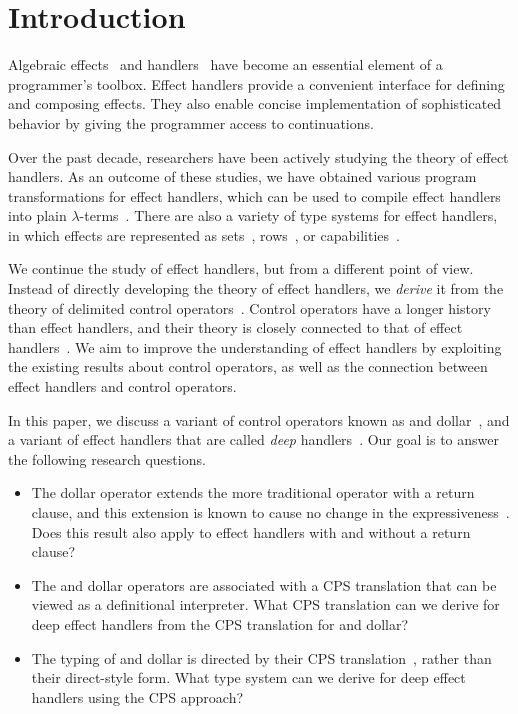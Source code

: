 \section{Introduction}
\label{sec:intro}

Algebraic effects~\cite{plotkin-effect} and handlers~\cite{plotkin-handler}
have become an essential element of a programmer's toolbox.
Effect handlers provide a convenient interface for defining and composing
effects.
They also enable concise implementation of sophisticated behavior by giving
the programmer access to continuations.

Over the past decade, researchers have been actively studying the theory
of effect handlers.
As an outcome of these studies, we have obtained various program
transformations for effect handlers, which can be used to compile effect
handlers into plain
$\lambda$-terms~\cite{hillerstrom-cps,schuster-capability,xie-evidently}.
There are also a variety of type systems for effect handlers, in which
effects are represented as sets~\cite{bauer-effsys},
rows~\cite{hillerstrom-links}, or
capabilities~\cite{brachthauser-lightweight}.

We continue the study of effect handlers, but from a different point of view.
Instead of directly developing the theory of effect handlers, we
\textit{derive} it from the theory of delimited control
operators~\cite{danvy-abstracting,kameyama-dynamic,materzok-subtyping,dyvbig-monadic}.
Control operators have a longer history than effect handlers, and their
theory is closely connected to that of effect handlers~\cite{forster-jfp,pirog-typedeq}.
We aim to improve the understanding of effect handlers by exploiting the 
existing results about control operators, as well as the connection between 
effect handlers and control operators.

In this paper, we discuss a variant of control operators known as \shiftztt
and dollar~\cite{materzok-hierarchy}, and a variant of effect handlers that
are called \textit{deep} handlers~\cite{kammar-handler}.
Our goal is to answer the following research questions.

\begin{itemize}
\item The dollar operator extends the more traditional \resetztt operator
  with a return clause, and this extension is known to cause no change in
  the expressiveness~\cite{materzok-hierarchy}.
  Does this result also apply to effect handlers with and without a return 
  clause?

\item The \shiftztt and dollar operators are associated with a CPS
  translation that can be viewed as a definitional interpreter.
  What CPS translation can we derive for deep effect handlers from the CPS
  translation for \shiftztt and dollar?

\item The typing of \shiftztt and dollar is directed by their CPS
  translation~\cite{danvy-context,kameyama-dynamic,materzok-subtyping},
  rather than their direct-style form.
  What type system can we derive for deep effect handlers using the CPS
  approach?
\end{itemize}

